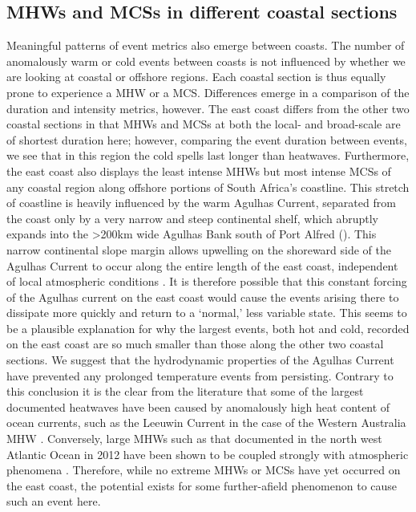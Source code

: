 \documentclass[a4paper,10pt,review]{elsarticle}
\begin{document}
\subsection{MHWs and MCSs in different coastal sections}
Meaningful patterns of event metrics also emerge between coasts. The number of anomalously warm or cold events between coasts is not influenced by whether we are looking at coastal or offshore regions. Each coastal section is thus equally prone to experience a MHW or a MCS. Differences emerge in a comparison of the duration and intensity metrics, however. The east coast differs from the other two coastal sections in that MHWs and MCSs at both the local- and broad-scale are of shortest duration here; however, comparing the event duration between events, we see that in this region the cold spells last longer than heatwaves. Furthermore, the east coast also displays the least intense MHWs but most intense MCSs of any coastal region along offshore portions of South Africa's coastline. This stretch of coastline is heavily influenced by the warm Agulhas Current, separated from the coast only by a very narrow and steep continental shelf, which abruptly expands into the >200km wide Agulhas Bank south of Port Alfred (). This narrow continental slope margin allows upwelling on the shoreward side of the Agulhas Current to occur along the entire length of the east coast, independent of local atmospheric conditions \citep{Lutjeharms2000}. It is therefore possible that this constant forcing of the Agulhas current on the east coast would cause the events arising there to dissipate more quickly and return to a `normal,' less variable state. This seems to be a plausible explanation for why the largest events, both hot and cold, recorded on the east coast are so much smaller than those along the other two coastal sections. We suggest that the hydrodynamic properties of the Agulhas Current have prevented any prolonged temperature events from persisting. Contrary to this conclusion it is the clear from the literature that some of the largest documented heatwaves have been caused by anomalously high heat content of ocean currents, such as the Leeuwin Current in the case of the Western Australia MHW \citep{Feng2013, Pearce2013, Wernberg2013}. Conversely, large MHWs such as that documented in the north west Atlantic Ocean in 2012 have been shown to be coupled strongly with atmospheric phenomena \citep{Mills2012, Chen2014, Chen2015}. Therefore, while no extreme MHWs or MCSs have yet occurred on the east coast, the potential exists for some further-afield phenomenon to cause such an event here.
\end{document}
